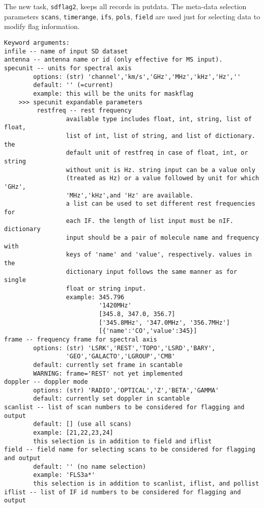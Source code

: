 The new task, {\tt sdflag2}, keeps all records in putdata. 
The meta-data selection parameters {\tt scans}, {\tt timerange}, 
{\tt ifs}, {\tt pols}, {\tt field} are used just for selecting data to modify
flag information.


\begin{verbatim}
Keyword arguments:
infile -- name of input SD dataset
antenna -- antenna name or id (only effective for MS input). 
specunit -- units for spectral axis
        options: (str) 'channel','km/s','GHz','MHz','kHz','Hz',''
        default: '' (=current)
        example: this will be the units for maskflag
    >>> specunit expandable parameters
         restfreq -- rest frequency
                 available type includes float, int, string, list of float, 
                 list of int, list of string, and list of dictionary. the 
                 default unit of restfreq in case of float, int, or string 
                 without unit is Hz. string input can be a value only 
                 (treated as Hz) or a value followed by unit for which 'GHz',
                 'MHz','kHz',and 'Hz' are available. 
                 a list can be used to set different rest frequencies for 
                 each IF. the length of list input must be nIF. dictionary 
                 input should be a pair of molecule name and frequency with 
                 keys of 'name' and 'value', respectively. values in the 
                 dictionary input follows the same manner as for single 
                 float or string input. 
                 example: 345.796
                          '1420MHz'
                          [345.8, 347.0, 356.7]
                          ['345.8MHz', '347.0MHz', '356.7MHz']
                          [{'name':'CO','value':345}]
frame -- frequency frame for spectral axis
        options: (str) 'LSRK','REST','TOPO','LSRD','BARY',
                 'GEO','GALACTO','LGROUP','CMB'
        default: currently set frame in scantable
        WARNING: frame='REST' not yet implemented
doppler -- doppler mode
        options: (str) 'RADIO','OPTICAL','Z','BETA','GAMMA'
        default: currently set doppler in scantable
scanlist -- list of scan numbers to be considered for flagging and output
        default: [] (use all scans)
        example: [21,22,23,24]
        this selection is in addition to field and iflist
field -- field name for selecting scans to be considered for flagging and output
        default: '' (no name selection)
        example: 'FLS3a*'
        this selection is in addition to scanlist, iflist, and pollist
iflist -- list of IF id numbers to be considered for flagging and output

\end{verbatim}
